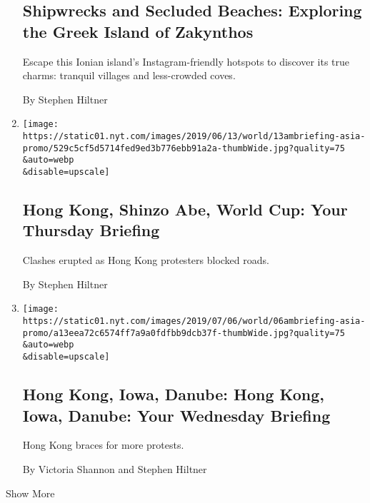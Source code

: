 \begin{enumerate}
  \hypertarget{shipwrecks-and-secluded-beaches-exploring-the-greek-island-of-zakynthos}{%
  \subsection{Shipwrecks and Secluded Beaches: Exploring the Greek
  Island of
  Zakynthos}\label{shipwrecks-and-secluded-beaches-exploring-the-greek-island-of-zakynthos}}

  Escape this Ionian island's Instagram-friendly hotspots to discover
  its true charms: tranquil villages and less-crowded coves.

  By Stephen Hiltner
\item
  \href{/2019/06/12/briefing/hong-kong-shinzo-abe-world-cup.html}{}

  \texttt{[image: https://static01.nyt.com/images/2019/06/13/world/13ambriefing-asia-promo/529c5cf5d5714fed9ed3b776ebb91a2a-thumbWide.jpg?quality=75\\\&auto=webp\\\&disable=upscale]}

  \hypertarget{hong-kong-shinzo-abe-world-cup-your-thursday-briefing}{%
  \subsection{Hong Kong, Shinzo Abe, World Cup: Your Thursday
  Briefing}\label{hong-kong-shinzo-abe-world-cup-your-thursday-briefing}}

  Clashes erupted as Hong Kong protesters blocked roads.

  By Stephen Hiltner
\item
  \href{/2019/06/11/briefing/hong-kong-iowa-danube.html}{}

  \texttt{[image: https://static01.nyt.com/images/2019/07/06/world/06ambriefing-asia-promo/a13eea72c6574ff7a9a0fdfbb9dcb37f-thumbWide.jpg?quality=75\\\&auto=webp\\\&disable=upscale]}

  \hypertarget{hong-kong-iowa-danube-hong-kong-iowa-danube-your-wednesday-briefing}{%
  \subsection{Hong Kong, Iowa, Danube: Hong Kong, Iowa, Danube: Your
  Wednesday
  Briefing}\label{hong-kong-iowa-danube-hong-kong-iowa-danube-your-wednesday-briefing}}

  Hong Kong braces for more protests.

  By Victoria Shannon and Stephen Hiltner
\end{enumerate}

Show More

